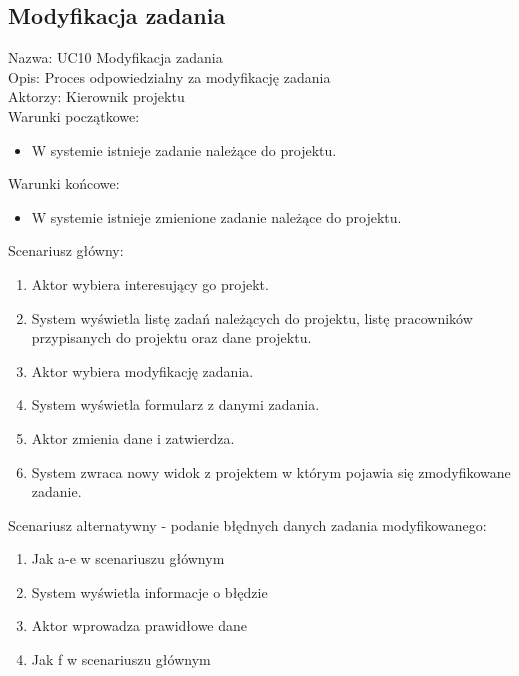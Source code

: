 \subsection{Modyfikacja zadania}
\begin{adjustwidth}{5em}{0pt}
Nazwa: UC10 Modyfikacja zadania\\
Opis: Proces odpowiedzialny za modyfikację zadania\\
Aktorzy: Kierownik projektu \\
Warunki początkowe:
\begin{itemize}
\item W systemie istnieje zadanie należące do projektu.
\end{itemize}
Warunki końcowe:
\begin{itemize}
\item W systemie istnieje zmienione zadanie należące do projektu.
\end{itemize}
Scenariusz główny:
\begin{enumerate}
\item Aktor wybiera interesujący go projekt.
\item System wyświetla listę zadań należących do projektu, listę pracowników przypisanych do projektu oraz dane projektu.
\item Aktor wybiera modyfikację zadania.
\item System wyświetla formularz z danymi zadania.
\item Aktor zmienia dane i zatwierdza.
\item System zwraca nowy widok z projektem w którym pojawia się zmodyfikowane zadanie.
\end{enumerate}
Scenariusz alternatywny - podanie błędnych danych zadania modyfikowanego: 
\begin{enumerate}
\item Jak a-e w scenariuszu głównym
\item System wyświetla informacje o błędzie
\item Aktor wprowadza prawidłowe dane
\item Jak f w scenariuszu głównym
\end{enumerate}
\end{adjustwidth}

